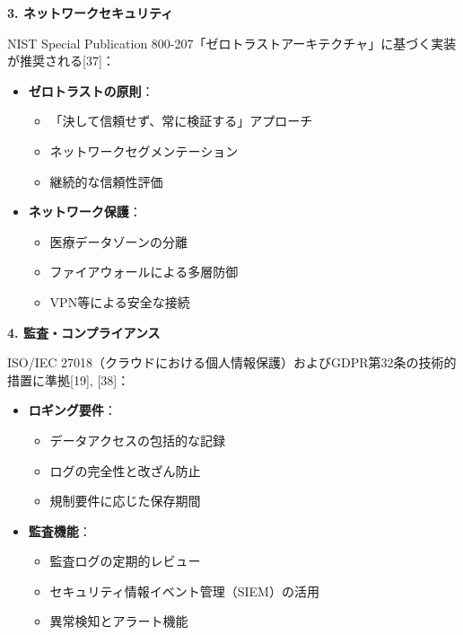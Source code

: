 \documentclass[
  a4paper,
  a4paper,
  11pt]{ltjsbook}
\providecommand{\tightlist}{%
  \setlength{\itemsep}{0pt}\setlength{\parskip}{0pt}}
\begin{document}
\textbf{3. ネットワークセキュリティ}

NIST Special Publication
800-207「ゼロトラストアーキテクチャ」に基づく実装が推奨される{[}37{]}：

\begin{itemize}
\tightlist
\item
  \textbf{ゼロトラストの原則}：

  \begin{itemize}
  \tightlist
  \item
    「決して信頼せず、常に検証する」アプローチ
  \item
    ネットワークセグメンテーション
  \item
    継続的な信頼性評価
  \end{itemize}
\item
  \textbf{ネットワーク保護}：

  \begin{itemize}
  \tightlist
  \item
    医療データゾーンの分離
  \item
    ファイアウォールによる多層防御
  \item
    VPN等による安全な接続
  \end{itemize}
\end{itemize}

\textbf{4. 監査・コンプライアンス}

ISO/IEC
27018（クラウドにおける個人情報保護）およびGDPR第32条の技術的措置に準拠{[}19{]},
{[}38{]}：

\begin{itemize}
\tightlist
\item
  \textbf{ロギング要件}：

  \begin{itemize}
  \tightlist
  \item
    データアクセスの包括的な記録
  \item
    ログの完全性と改ざん防止
  \item
    規制要件に応じた保存期間
  \end{itemize}
\item
  \textbf{監査機能}：

  \begin{itemize}
  \tightlist
  \item
    監査ログの定期的レビュー
  \item
    セキュリティ情報イベント管理（SIEM）の活用
  \item
    異常検知とアラート機能
  \end{itemize}
\end{itemize}
\end{document}
